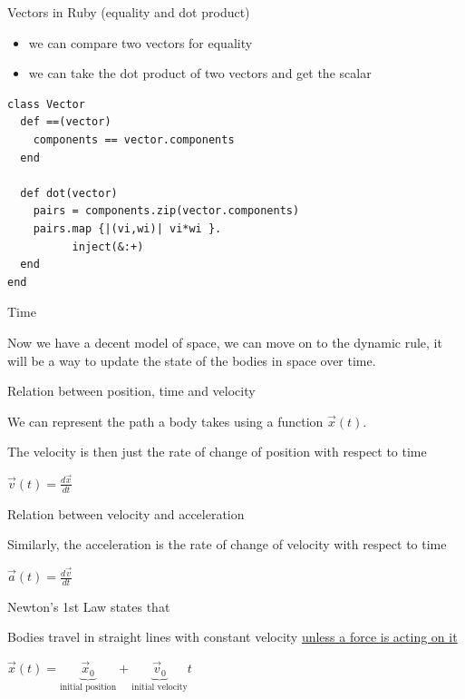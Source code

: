 \documentclass[bigger]{beamer}
\begin{document}
\begin{frame}[fragile,label=sec-18]{Vectors in Ruby (equality and dot product)}
 \begin{itemize}
\item we can compare two vectors for equality
\item we can take the dot product of two vectors and get the scalar
\end{itemize}

\begin{verbatim}
class Vector
  def ==(vector)
    components == vector.components
  end

  def dot(vector)
    pairs = components.zip(vector.components)
    pairs.map {|(vi,wi)| vi*wi }.
          inject(&:+)
  end
end
\end{verbatim}
\end{frame}
\begin{frame}[label=sec-19]{Time}
\begin{block}{Now we have a decent \alert{model of space}, we can move on to the \alert{dynamic rule}, it will be a way to update the state of the bodies in space over time.}
\end{block}
\end{frame}
\begin{frame}[label=sec-20]{Relation between position, time and velocity}
\begin{block}{We can represent the path a body takes using a function $\vec{x}(t)$.}
\end{block}

\begin{block}{The velocity is then just the \alert{rate of change of position with respect to time}}
\begin{center}
{\LARGE $\vec{v}(t) = \frac{d\vec{x}}{dt}$}
\end{center}
\end{block}
\end{frame}

\begin{frame}[label=sec-21]{Relation between velocity and acceleration}
\begin{block}{Similarly, the acceleration is the \alert{rate of change of velocity with respect to time}}
\begin{center}
{\LARGE $\vec{a}(t) = \frac{d\vec{v}}{dt}$}
\end{center}
\end{block}
\end{frame}

\begin{frame}[label=sec-22]{Newton's 1st Law states that}
\begin{block}{Bodies travel in straight lines with constant velocity \uline{unless a force is acting on it}}
\begin{center}
{\LARGE $\vec{x}(t) = \underbrace{\vec{x}_0}_\text{initial position} + \underbrace{\vec{v}_0}_\text{initial velocity}t$ }
\end{center}
\end{block}
\end{frame}
\end{document}
